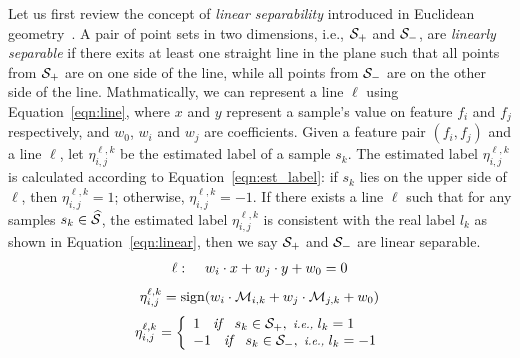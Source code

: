 Let us first review the concept of {\em linear separability} introduced in Euclidean geometry~\cite{shamos1975geometric}. A pair of point sets in two dimensions, i.e., $\sss_+$ and $\sss_-$, are \emph{linearly separable} if there exits at least one straight line in the plane such that all points from $\sss_+$ are on one side of the line, while all points from $\sss_-$ are on the other side of the line. Mathmatically, we can represent a line $\ell$ using Equation~\ref{eqn:line}, where $x$ and $y$ represent a sample's value on feature $f_i$ and $f_j$ respectively, and $w_0$, $w_i$ and $w_j$ are coefficients. Given a feature pair $(f_i,f_j)$ and a line $\ell$, let $\eta_{i,j}^{\ell,k}$ be the estimated label of a sample $s_k$. The estimated label $\eta_{i,j}^{\ell,k}$ is calculated according to Equation~\ref{eqn:est_label}: if $s_k$ lies on the upper side of $\ell$, then $\eta_{i,j}^{\ell,k}=1$; otherwise, $\eta_{i,j}^{\ell,k}=-1$.   
If there exists a line $\ell$ such that for any samples $s_k\in \widehat{\sss}$, the estimated label $\eta_{i,j}^{\ell,k}$ is consistent with the real label $l_k$ as shown in Equation~\ref{eqn:linear}, then we say $\sss_+$ and $\sss_-$ are linear separable. 
\begin{equation}\label{eqn:line}
\begin{split}
\ell: \hspace{4mm} w_i\cdot x + w_j\cdot y +w_0 =0 
\end{split}
\end{equation}
\begin{equation}\label{eqn:est_label}
\eta_{i,j}^{\ell,k}=\sign(w_i\cdot \mm_{i,k} + w_j\cdot \mm_{j,k} +w_0)
\end{equation}
\begin{equation}\label{eqn:linear}
\eta_{i,j}^{\ell,k} = \left\{
                \begin{array}{ll}
                  1 \textit{\hspace{2mm} if \hspace{2mm}} s_k\in \sss_+, \textit{ i.e., } l_k=1 \\
                  -1 \textit{\hspace{2mm} if \hspace{2mm}} s_k\in \sss_-, \textit{ i.e., } l_k=-1 
                \end{array}
              \right.
\end{equation}



